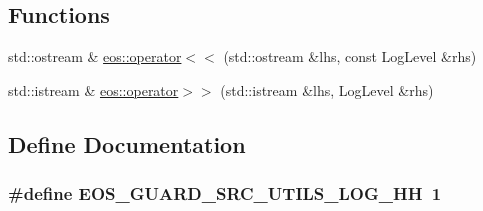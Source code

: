 \subsection*{Functions}
\begin{Indent}{\bf }\par
{\em \label{_amgrpd41d8cd98f00b204e9800998ecf8427e}
 }\begin{DoxyCompactItemize}
\item 
std::ostream \& \hyperlink{namespaceeos_a397c7661ab7dbc53ad04d52cd371c8aa}{eos::operator$<$$<$} (std::ostream \&lhs, const LogLevel \&rhs)
\item 
std::istream \& \hyperlink{namespaceeos_a28eec37f82312fce69a8c2b08b272ef9}{eos::operator$>$$>$} (std::istream \&lhs, LogLevel \&rhs)
\end{DoxyCompactItemize}
\end{Indent}


\subsection{Define Documentation}
\hypertarget{log_8hh_a911a0223120f9d69b5ba0a5782c3a7a2}{
\subsubsection[{EOS\_\-GUARD\_\-SRC\_\-UTILS\_\-LOG\_\-HH}]{\setlength{\rightskip}{0pt plus 5cm}\#define EOS\_\-GUARD\_\-SRC\_\-UTILS\_\-LOG\_\-HH~1}}
\label{log_8hh_a911a0223120f9d69b5ba0a5782c3a7a2}
